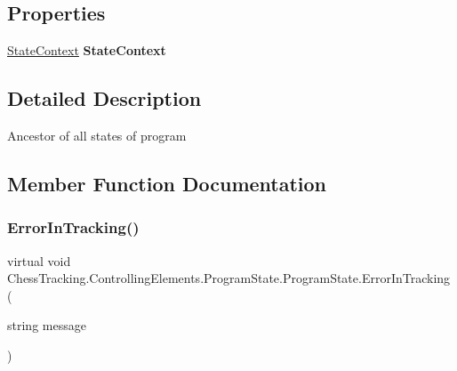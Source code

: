 \subsection*{Properties}
\begin{DoxyCompactItemize}
\item 
\mbox{\label{class_chess_tracking_1_1_controlling_elements_1_1_program_state_1_1_program_state_a91b4d54d7e4908acfe3de8f924bcf35e}} 
\mbox{\hyperlink{class_chess_tracking_1_1_controlling_elements_1_1_program_state_1_1_state_context}{State\+Context}} {\bfseries State\+Context}
\end{DoxyCompactItemize}


\subsection{Detailed Description}
Ancestor of all states of program 



\subsection{Member Function Documentation}
\mbox{\label{class_chess_tracking_1_1_controlling_elements_1_1_program_state_1_1_program_state_a696ede3bce5b54db8f0d2dd9e7d8eabb}} 
\subsubsection{\texorpdfstring{ErrorInTracking()}{ErrorInTracking()}}
{\footnotesize\ttfamily virtual void Chess\+Tracking.\+Controlling\+Elements.\+Program\+State.\+Program\+State.\+Error\+In\+Tracking (\begin{DoxyParamCaption}\item[{string}]{message }\end{DoxyParamCaption})\hspace{0.3cm}{\ttfamily [virtual]}}



